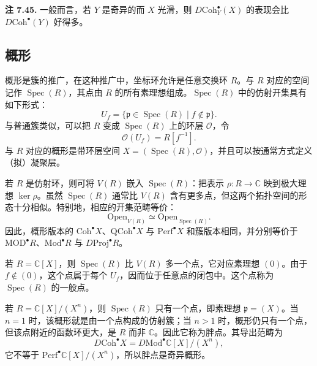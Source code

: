 \begin{note}\label{note:singular-support-in-smooth-variety}
\textbf{注 7.45.} 一般而言，若 $Y$ 是奇异的而 $X$ 光滑，则 $D\mathrm{Coh}^{\bullet}_Y(X)$ 的表现会比 $D\mathrm{Coh}^{\bullet}(Y)$ 好得多。
\end{note}

\subsection{概形}\label{subsec:schemes}
概形是簇的推广，在这种推广中，坐标环允许是任意交换环 $R$。与 $R$ 对应的空间记作 $\operatorname{Spec}(R)$，其点由 $R$ 的所有素理想组成。$\operatorname{Spec}(R)$ 中的仿射开集具有如下形式：
\[
  U_f=\{\mathfrak p\in\operatorname{Spec}(R)\mid f\notin\mathfrak p\}.
\]
与普通簇类似，可以把 $R$ 变成 $\operatorname{Spec}(R)$ 上的环层 $\mathcal O$，令
\[
  \mathcal O(U_f)=R[f^{-1}].
\]
与 $R$ 对应的概形是带环层空间 $X=(\operatorname{Spec}(R),\mathcal O)$，并且可以按通常方式定义（拟）凝聚层。

若 $R$ 是仿射环，则可将 $V(R)$ 嵌入 $\operatorname{Spec}(R)$：把表示 $\rho\colon R\to\mathbb C$ 映到极大理想 $\ker\rho$。虽然 $\operatorname{Spec}(R)$ 通常比 $V(R)$ 含有更多点，但这两个拓扑空间的形态十分相似。特别地，相应的开集范畴等价：
\[
  \mathrm{Open}_{V(R)}\simeq\mathrm{Open}_{\operatorname{Spec}(R)}.
\]
因此，概形版本的 $\mathrm{Coh}^{\bullet}X$、$\mathrm{QCoh}^{\bullet}X$ 与 $\mathrm{Perf}^{\bullet}X$ 和簇版本相同，并分别等价于 $\mathrm{MOD}^{\bullet}R$、$\mathrm{Mod}^{\bullet}R$ 与 $D\mathrm{Proj}^{\bullet}R$。

\begin{example}[一般点]
若 $R=\mathbb C[X]$，则 $\operatorname{Spec}(R)$ 比 $V(R)$ 多一个点，它对应素理想 $(0)$。由于 $f\notin(0)$，这个点属于每个 $U_f$，因而位于任意点的闭包中。这个点称为 $\operatorname{Spec}(R)$ 的一般点。
\end{example}

\begin{example}[胖点]
若 $R=\mathbb C[X]/(X^n)$，则 $\operatorname{Spec}(R)$ 只有一个点，即素理想 $\mathfrak p=(X)$。当 $n=1$ 时，该概形就是由一个点构成的仿射簇；当 $n>1$ 时，概形仍只有一个点，但该点附近的函数环更大，是 $R$ 而非 $\mathbb C$。因此它称为胖点。其导出范畴为
\[
  D\mathrm{Coh}^{\bullet}X=D\mathrm{Mod}^{\bullet}\mathbb C[X]/(X^n),
\]
它不等于 $\mathrm{Perf}^{\bullet}\mathbb C[X]/(X^n)$，所以胖点是奇异概形。
\end{example}

